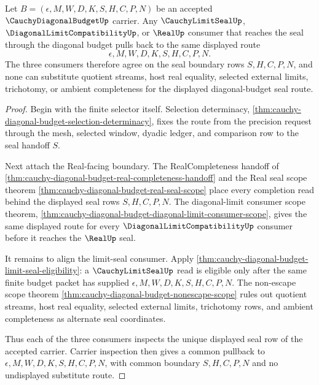 \begin{theorem}
\label{thm:cauchy-diagonal-budget-seal-synchronizer-pullback}
Let $B=(\epsilon,M,W,D,K,S,H,C,P,N)$ be an accepted $\CauchyDiagonalBudgetUp$ carrier. Any $\CauchyLimitSealUp$, $\DiagonalLimitCompatibilityUp$, or $\RealUp$ consumer that reaches the seal through the diagonal budget pulls back to the same displayed route
$$
\epsilon,M,W,D,K,S,H,C,P,N.
$$
The three consumers therefore agree on the seal boundary rows $S,H,C,P,N$, and none can substitute quotient streams, host real equality, selected external limits, trichotomy, or ambient completeness for the displayed diagonal-budget seal route.
\end{theorem}
\begin{proof}
Begin with the finite selector itself. Selection determinacy, \autoref{thm:cauchy-diagonal-budget-selection-determinacy}, fixes the route from the precision request through the mesh, selected window, dyadic ledger, and comparison row to the seal handoff $S$.

Next attach the Real-facing boundary. The RealCompleteness handoff of \autoref{thm:cauchy-diagonal-budget-real-completeness-handoff} and the Real seal scope theorem \autoref{thm:cauchy-diagonal-budget-real-seal-scope} place every completion read behind the displayed seal rows $S,H,C,P,N$. The diagonal-limit consumer scope theorem, \autoref{thm:cauchy-diagonal-budget-diagonal-limit-consumer-scope}, gives the same displayed route for every $\DiagonalLimitCompatibilityUp$ consumer before it reaches the $\RealUp$ seal.

It remains to align the limit-seal consumer. Apply \autoref{thm:cauchy-diagonal-budget-limit-seal-eligibility}: a $\CauchyLimitSealUp$ read is eligible only after the same finite budget packet has supplied $\epsilon,M,W,D,K,S,H,C,P,N$. The non-escape scope theorem \autoref{thm:cauchy-diagonal-budget-nonescape-scope} rules out quotient streams, host real equality, selected external limits, trichotomy rows, and ambient completeness as alternate seal coordinates.

Thus each of the three consumers inspects the unique displayed seal row of the accepted carrier. Carrier inspection then gives a common pullback to $\epsilon,M,W,D,K,S,H,C,P,N$, with common boundary $S,H,C,P,N$ and no undisplayed substitute route.
\end{proof}

